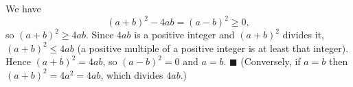 We have
\[
(a+b)^2-4ab=(a-b)^2\ge0,
\]
so $(a+b)^2\ge4ab$. Since $4ab$ is a positive integer and $(a+b)^2$ divides it, $(a+b)^2\le4ab$ (a positive multiple of a positive integer is at least that integer). Hence $(a+b)^2=4ab$, so $(a-b)^2=0$ and $a=b$. $\blacksquare$ (Conversely, if $a=b$ then $(a+b)^2=4a^2=4ab$, which divides $4ab$.)
